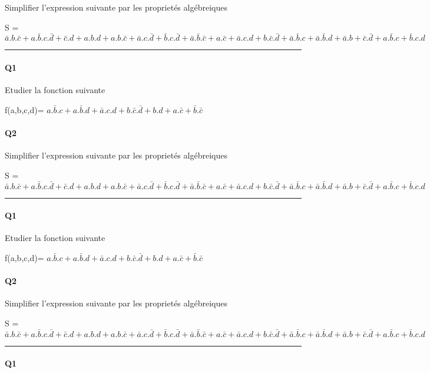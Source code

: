 Simplifier l'expression suivante par les proprietés algébreiques 

S = $\bar a.b.\bar c+a.\bar b.c.\bar d + \bar c.d+a.b.d+a.b.\bar c+\bar a.c.\bar d+\bar b.c.\bar d+\bar a.\bar b.\bar c + a.\bar c+\bar a.c.d+b.\bar c.\bar d+\bar a.\bar b.c+\bar a.\bar b.d + \bar a.b+\bar c.\bar d+a.\bar b.c+\bar b.c.d$

\hrule width 1\linewidth
\paragraph{Q1}

Etudier la fonction suivante

f(a,b,c,d)= $a.\bar b.c+a.\bar b.d+\bar a.c.d+b.\bar c.\bar d + b.d+a.\bar c+\bar b.\bar c$

\paragraph{Q2}

Simplifier l'expression suivante par les proprietés algébreiques 

S = $\bar a.b.\bar c+a.\bar b.c.\bar d + \bar c.d+a.b.d+a.b.\bar c+\bar a.c.\bar d+\bar b.c.\bar d+\bar a.\bar b.\bar c + a.\bar c+\bar a.c.d+b.\bar c.\bar d+\bar a.\bar b.c+\bar a.\bar b.d + \bar a.b+\bar c.\bar d+a.\bar b.c+\bar b.c.d$

\hrule width 1\linewidth
\paragraph{Q1}

Etudier la fonction suivante

f(a,b,c,d)= $a.\bar b.c+a.\bar b.d+\bar a.c.d+b.\bar c.\bar d + b.d+a.\bar c+\bar b.\bar c$

\paragraph{Q2}

Simplifier l'expression suivante par les proprietés algébreiques 

S = $\bar a.b.\bar c+a.\bar b.c.\bar d + \bar c.d+a.b.d+a.b.\bar c+\bar a.c.\bar d+\bar b.c.\bar d+\bar a.\bar b.\bar c + a.\bar c+\bar a.c.d+b.\bar c.\bar d+\bar a.\bar b.c+\bar a.\bar b.d + \bar a.b+\bar c.\bar d+a.\bar b.c+\bar b.c.d$

\hrule width 1\linewidth
\paragraph{Q1}

